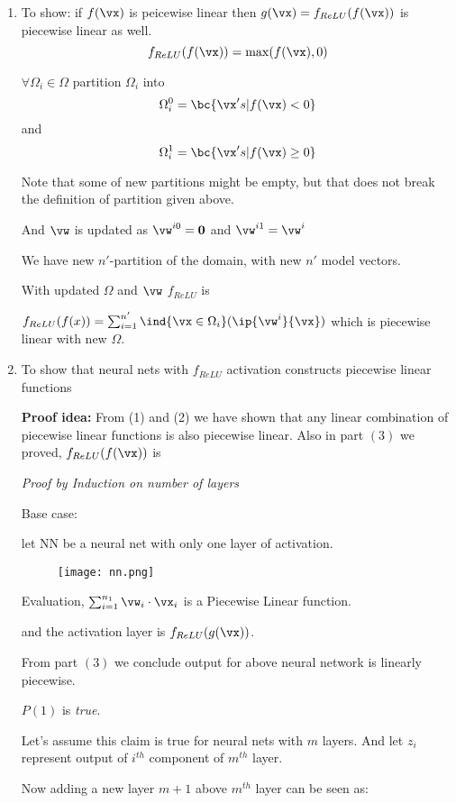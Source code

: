 \documentclass[a4paper,11pt]{article}
\begin{document}
\begin{mlsolution}
\begin{enumerate}
\item
To show: if $f(\vx)$ is peicewise linear then $g(\vx) = f_{ReLU}(f(\vx)) $ is piecewise linear as well.
\[ 
    f_{ReLU}(f(\vx)) = \max(f(\vx), 0)
\]

$\forall \Omega_i \in \Omega$ partition $\Omega_i$ into 
\[ \Omega_i^{0} = \bc{ \vx's | f(\vx) < 0} \]
and
\[ \Omega_i^{1} = \bc{ \vx's | f(\vx) \geq 0} \]

Note that some of new partitions might be empty, but that does not break the definition of partition given above.

And $\vw$ is updated as $ \vw^{i0}  = \textbf{0}$ and $\vw^{i1} = \vw^i$

We have new $n'$-partition of the domain, with new $n'$ model vectors.

With updated $\Omega$ and $\vw$ $f_{ReLU}$ is 

$f_{ReLU}(f(x)) = \sum_{i=1}^{n'} \ind{\vx \in \Omega_{i}} ( \ip{\vw^i}{\vx} )$ which is piecewise linear with new $\Omega$.

\item To show that neural nets with $f_{ReLU}$ activation constructs piecewise linear functions


\textbf{Proof idea:} From (1) and (2) we have shown that any linear combination of piecewise linear functions is also piecewise linear. Also in part $(3)$ we proved, $f_{ReLU}(f(\vx))$ is 

\textit{Proof by Induction on number of layers}

Base case:

let NN be a neural net with only one layer of activation. 


\begin{figure}[th]%
\centering
\texttt{[image: nn.png]}%
\hfill
\caption{}%
\label{fig:proto}%
\end{figure}

Evaluation, $ \sum_{i=1}^{n_1}{\vw_i \cdot \vx_i }$ is a Piecewise Linear function.

and the activation layer is $f_{ReLU}(g(\vx))$.

From part $(3)$ we conclude output for above neural network is linearly piecewise.

$P(1)$ is \textit{true}.

Let's assume this claim is true for neural nets with $m$ layers. And let $z_i$ represent output of $i^{th}$ component of $m^{th}$ layer.

Now adding a new layer $m+1$ above $m^{th}$ layer can be seen as: 


\end{enumerate}
\end{mlsolution}
\end{document}
